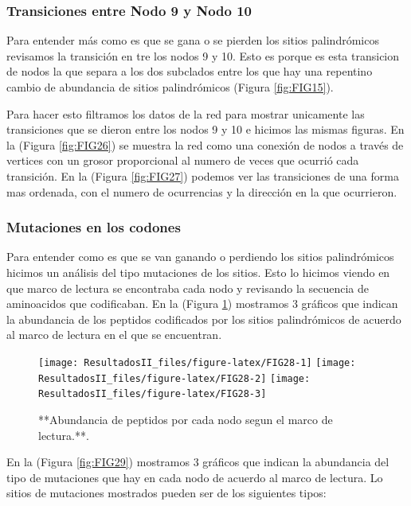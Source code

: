 \documentclass[
]{book}
\begin{document}
\hypertarget{transiciones-entre-nodo-9-y-nodo-10-4}{%
\subsubsection{Transiciones entre Nodo 9 y Nodo 10}\label{transiciones-entre-nodo-9-y-nodo-10-4}}

Para entender más como es que se gana o se pierden los sitios palindrómicos revisamos la transición en tre los nodos 9 y 10. Esto es porque es esta transicion de nodos la que separa a los dos subclados entre los que hay una repentino cambio de abundancia de sitios palindrómicos (Figura \ref{fig:FIG15}).

Para hacer esto filtramos los datos de la red para mostrar unicamente las transiciones que se dieron entre los nodos 9 y 10 e hicimos las mismas figuras.
En la (Figura \ref{fig:FIG26}) se muestra la red como una conexión de nodos a través de vertices con un grosor proporcional al numero de veces que ocurrió cada transición. En la (Figura \ref{fig:FIG27}) podemos ver las transiciones de una forma mas ordenada, con el numero de ocurrencias y la dirección en la que ocurrieron.

\hypertarget{mutaciones-en-los-codones-4}{%
\subsubsection{Mutaciones en los codones}\label{mutaciones-en-los-codones-4}}

Para entender como es que se van ganando o perdiendo los sitios palindrómicos hicimos un análisis del tipo mutaciones de los sitios. Esto lo hicimos viendo en que marco de lectura se encontraba cada nodo y revisando la secuencia de aminoacidos que codificaban. En la (Figura \ref{fig:FIG28}) mostramos 3 gráficos que indican la abundancia de los peptidos codificados por los sitios palindrómicos de acuerdo al marco de lectura en el que se encuentran.

\begin{figure}

{\centering \texttt{[image: ResultadosII\_files/figure-latex/FIG28-1]} \texttt{[image: ResultadosII\_files/figure-latex/FIG28-2]} \texttt{[image: ResultadosII\_files/figure-latex/FIG28-3]} 

}

\caption{**Abundancia de peptidos por cada nodo segun el marco de lectura.**.}\label{fig:FIG28}
\end{figure}

En la (Figura \ref{fig:FIG29}) mostramos 3 gráficos que indican la abundancia del tipo de mutaciones que hay en cada nodo de acuerdo al marco de lectura. Lo sitios de mutaciones mostrados pueden ser de los siguientes tipos:
\end{document}
